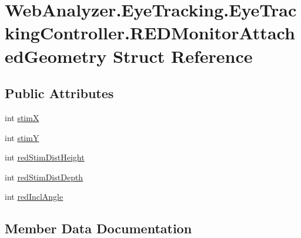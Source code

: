 \hypertarget{struct_web_analyzer_1_1_eye_tracking_1_1_eye_tracking_controller_1_1_r_e_d_monitor_attached_geometry}{}\section{Web\+Analyzer.\+Eye\+Tracking.\+Eye\+Tracking\+Controller.\+R\+E\+D\+Monitor\+Attached\+Geometry Struct Reference}
\label{struct_web_analyzer_1_1_eye_tracking_1_1_eye_tracking_controller_1_1_r_e_d_monitor_attached_geometry}
\subsection*{Public Attributes}
\begin{DoxyCompactItemize}
\item 
int \hyperlink{struct_web_analyzer_1_1_eye_tracking_1_1_eye_tracking_controller_1_1_r_e_d_monitor_attached_geometry_afa74843ca98b6917acf93ae7eb33e788}{stim\+X}
\item 
int \hyperlink{struct_web_analyzer_1_1_eye_tracking_1_1_eye_tracking_controller_1_1_r_e_d_monitor_attached_geometry_a46c7e6958d80fe749b8df93404a9bbc5}{stim\+Y}
\item 
int \hyperlink{struct_web_analyzer_1_1_eye_tracking_1_1_eye_tracking_controller_1_1_r_e_d_monitor_attached_geometry_af61588e67a4886a43bf75e828aba6c26}{red\+Stim\+Dist\+Height}
\item 
int \hyperlink{struct_web_analyzer_1_1_eye_tracking_1_1_eye_tracking_controller_1_1_r_e_d_monitor_attached_geometry_a89b3250422002212ef66a42fd5df0471}{red\+Stim\+Dist\+Depth}
\item 
int \hyperlink{struct_web_analyzer_1_1_eye_tracking_1_1_eye_tracking_controller_1_1_r_e_d_monitor_attached_geometry_ac35ac39bdd0d0dd12e02fee766496e2c}{red\+Incl\+Angle}
\end{DoxyCompactItemize}


\subsection{Member Data Documentation}
\hypertarget{struct_web_analyzer_1_1_eye_tracking_1_1_eye_tracking_controller_1_1_r_e_d_monitor_attached_geometry_ac35ac39bdd0d0dd12e02fee766496e2c}{}
